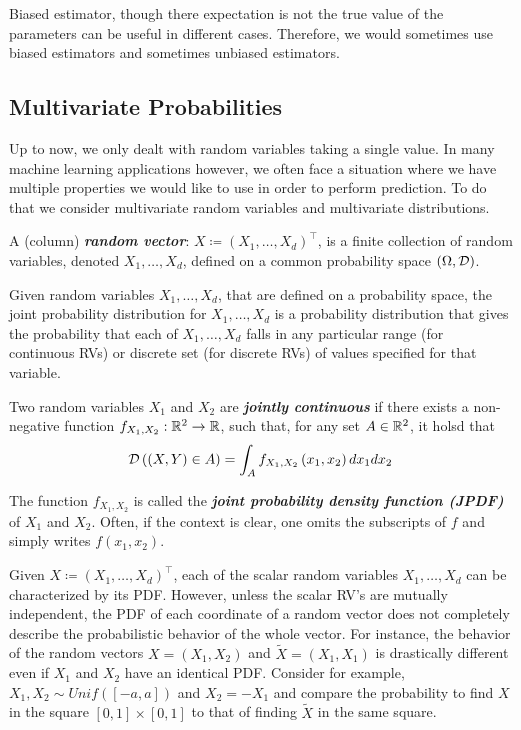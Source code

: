 \begin{remark}
Biased estimator, though there expectation is not the true value of the parameters can be useful in different cases. Therefore, we would sometimes use biased estimators and sometimes unbiased estimators.
\end{remark}

\subsection{Multivariate Probabilities}
Up to now, we only dealt with random variables taking a single value. In many machine learning applications however, we often face a situation where we have multiple properties we would like to use in order to perform prediction. To do that we consider multivariate random variables and multivariate distributions.

\begin{definition}
A  (column)	\textbf{\textit{random vector}}: $X\coloneqq \left(X_1, \dots, X_d\right)^\top$, is a finite collection of random variables, denoted $X_1, \dots, X_d$, defined on a common probability space $(\Omega, \mathcal{D})$.
\end{definition}

\begin{definition}
Given random variables $X_1, \dots, X_d$, that are defined on a probability space, the joint probability distribution for $X_1, \dots, X_d$ is a probability distribution that gives the probability that each of $X_1, \dots, X_d$ falls in any particular range (for continuous RVs) or discrete set (for discrete RVs) of values specified for that variable.
\end{definition}

\begin{definition}
Two random variables $X_1$ and $X_2$ are \textbf{\textit{jointly continuous}} if there exists a non-negative function $f_{X_1,X_2}: \mathbb{R}^2\to\mathbb{R} $, such that, for any set $A \in\mathbb{R} ^2$, it holsd that $$\mathcal{D}\left( (X,Y) \in A \right) = \int_A f_{X_1,X_2}\left(x_1, x_2\right) dx_1 dx_2$$

The function $f_{X_1,X_2}$ is called the \textbf{\textit{joint probability density function (JPDF)}} of $X_1$ and $X_2$. Often, if the context is clear, one omits the subscripts of $f$ and simply writes  $ f\left(x_1, x_2\right)$.
\end{definition}

Given $X \coloneqq (X_1, \dots, X_d)^\top$, each of the scalar random variables $X_1, \dots, X_d$ can be characterized by its PDF. However, unless the scalar RV's are mutually independent, the PDF of each coordinate of a random vector does not completely describe the probabilistic behavior of the whole vector. For instance, the behavior of the random vectors $X = \left(X_1, X_2\right)$ and $\tilde{X} = \left(X_1, X_1\right)$ is drastically different even if $X_1$ and $X_2$  have an identical PDF. Consider for example, $X_1, X_2 \sim Unif([-a, a])$ and $X_2 = - X_1$ and compare the probability to find $X$ in the square $[0,1]\times [0,1]$ to that of finding $\tilde{X}$ in the same square.

